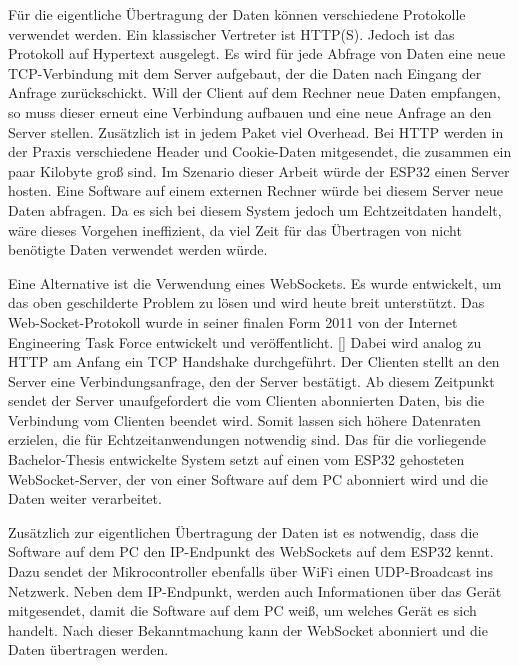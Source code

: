 Für die eigentliche Übertragung der Daten können verschiedene Protokolle
verwendet werden. Ein klassischer Vertreter ist HTTP(S). Jedoch ist das
Protokoll auf Hypertext ausgelegt. Es wird für jede Abfrage von Daten
eine neue TCP-Verbindung mit dem Server aufgebaut, der die Daten nach
Eingang der Anfrage zurückschickt. Will der Client auf dem Rechner neue
Daten empfangen, so muss dieser erneut eine Verbindung aufbauen und eine
neue Anfrage an den Server stellen. Zusätzlich ist in jedem Paket viel
Overhead. Bei HTTP werden in der Praxis verschiedene Header und
Cookie-Daten mitgesendet, die zusammen ein paar Kilobyte groß sind. Im
Szenario dieser Arbeit würde der ESP32 einen Server hosten. Eine
Software auf einem externen Rechner würde bei diesem Server neue Daten
abfragen. Da es sich bei diesem System jedoch um Echtzeitdaten handelt,
wäre dieses Vorgehen ineffizient, da viel Zeit für das Übertragen von
nicht benötigte Daten verwendet werden würde.

Eine Alternative ist die Verwendung eines WebSockets. Es wurde
entwickelt, um das oben geschilderte Problem zu lösen und wird heute
breit unterstützt. Das Web-Socket-Protokoll wurde in seiner finalen Form
2011 von der Internet Engineering Task Force entwickelt und
veröffentlicht. {[}\citep{ietfRFC6455WebSocket}{]} Dabei wird analog zu
HTTP am Anfang ein TCP Handshake durchgeführt. Der Clienten stellt an
den Server eine Verbindungsanfrage, den der Server bestätigt. Ab diesem
Zeitpunkt sendet der Server unaufgefordert die vom Clienten abonnierten
Daten, bis die Verbindung vom Clienten beendet wird. Somit lassen sich
höhere Datenraten erzielen, die für Echtzeitanwendungen notwendig sind.
Das für die vorliegende Bachelor-Thesis entwickelte System setzt auf
einen vom ESP32 gehosteten WebSocket-Server, der von einer Software auf
dem PC abonniert wird und die Daten weiter verarbeitet.

Zusätzlich zur eigentlichen Übertragung der Daten ist es notwendig, dass
die Software auf dem PC den IP-Endpunkt des WebSockets auf dem ESP32
kennt. Dazu sendet der Mikrocontroller ebenfalls über WiFi einen
UDP-Broadcast ins Netzwerk. Neben dem IP-Endpunkt, werden auch
Informationen über das Gerät mitgesendet, damit die Software auf dem PC
weiß, um welches Gerät es sich handelt. Nach dieser Bekanntmachung kann
der WebSocket abonniert und die Daten übertragen werden.

